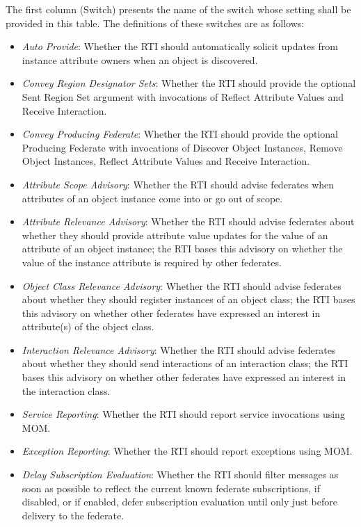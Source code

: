 The first column (Switch) presents the name of the switch whose setting shall be provided in this table. The definitions of these switches are as follows:
\begin{itemize}[topsep=1pt,itemsep=2pt]
\item \textit{Auto Provide}: Whether the RTI should automatically solicit updates from instance attribute owners when an object is discovered.
\item \textit{Convey Region Designator Sets}: Whether the RTI should provide the optional Sent Region Set argument with invocations of Reflect Attribute Values and Receive Interaction.
\item \textit{Convey Producing Federate}: Whether the RTI should provide the optional Producing Federate with invocations of Discover Object Instances, Remove Object Instances, Reflect Attribute Values and Receive Interaction.
\item \textit{Attribute Scope Advisory}: Whether the RTI should advise federates when attributes of an object instance come into or go out of scope.
\item \textit{Attribute Relevance Advisory}: Whether the RTI should advise federates about whether they should provide attribute value updates for the value of an attribute of an object instance; the RTI bases this advisory on whether the value of the instance attribute is required by other federates.
\item \textit{Object Class Relevance Advisory}: Whether the RTI should advise federates about whether they should register instances of an object class; the RTI bases this advisory on whether other federates have expressed an interest in attribute(s) of the object class.
\item \textit{Interaction Relevance Advisory}: Whether the RTI should advise federates about whether they should send interactions of an interaction class; the RTI bases this advisory on whether other federates have expressed an interest in the interaction class.
\item \textit{Service Reporting}: Whether the RTI should report service invocations using MOM.
\item \textit{Exception Reporting}: Whether the RTI should report exceptions using MOM.
\item \textit{Delay Subscription Evaluation}: Whether the RTI should filter messages as soon as possible to reflect the current known federate subscriptions, if disabled, or if enabled, defer subscription evaluation until only just before delivery to the federate.
\end{itemize}

